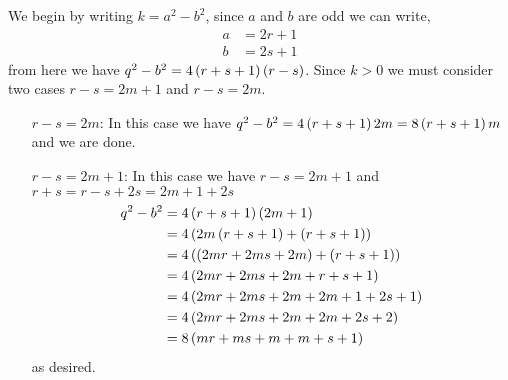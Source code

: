 \begin{mdframed}[style=darkAnswer,frametitle={Joe Starr}]

We begin by writing $k=a^2-b^2$, since $a$ and $b$ are odd we can write, 
\begin{align*}
    a&=2r+1\\
    b&=2s+1
\end{align*} 
from here we have $q^2-b^2=4\left(r+s+1\right)\left(r-s\right)$. Since $k>0$ we must consider 
two cases $r-s=2m+1$ and $r-s=2m$. 
\begin{itemize}[align=left]
    \item [$r-s=2m$:]{\hspace{.5in}\newline
        In this case we have $q^2-b^2=4\left(r+s+1\right)2m=8\left(r+s+1\right)m$ and we are 
        done. 
    }
    \item [$r-s=2m+1$:]{\hspace{.5in}\newline
        In this case we have $r-s=2m+1$ and $r+s=r-s+2s=2m+1+2s$
        \begin{align*}
            q^2-b^2&=4\left(r+s+1\right)\left(2m+1\right)\\
            &=4\left(2m\left(r+s+1\right)+\left(r+s+1\right)\right)\\            
            &=4\left(\left(2mr+2ms+2m\right)+\left(r+s+1\right)\right)\\            
            &=4\left(2mr+2ms+2m+r+s+1\right)\\         
            &=4\left(2mr+2ms+2m+2m+1+2s+1\right)\\         
            &=4\left(2mr+2ms+2m+2m+2s+2\right)\\         
            &=8\left(mr+ms+m+m+s+1\right)\\         
        \end{align*}
        as desired.
    }
\end{itemize}

\end{mdframed}
\newpage
